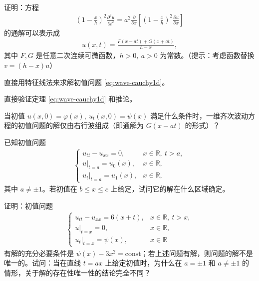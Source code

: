 \documentclass[../../main.tex]{subfiles}%
\begin{document}
\begin{example}
证明：方程
\begin{align*}
\left(1-\frac{x}{h}\right)^2\frac{\partial^2u}{\partial t^2}
=a^2\frac{\partial}{\partial x}\left[\left(1-\frac{x}{h}\right)^2\frac{\partial u}{\partial x}\right]
\end{align*}
的通解可以表示成
\begin{align*}
u(x,t)=\frac{F(x-at)+G(x+at)}{h-x},
\end{align*}
其中 $F,G$ 是任意二次连续可微函数，$h>0,\ a>0$ 为常数。（提示：考虑函数替换 $v=(h-x)u$）
\end{example}

\begin{example}
直接用特征线法来求解初值问题 \eqref{eq:wave-cauchy1d}。
\end{example}

\begin{example}
直接验证定理 \eqref{eq:wave-cauchy1d} 和推论。
\end{example}

\begin{example}
当初值 $u(x,0)=\varphi(x),\ u_t(x,0)=\psi(x)$ 满足什么条件时，一维齐次波动方程的初值问题的解仅由右行波组成（即通解为 $G(x-at)$ 的形式）？
\end{example}

\begin{example}
已知初值问题
\begin{align*}
\begin{cases}
u_{tt}-u_{xx}=0, & x\in\mathbb{R},\ t>a, \\
u|_{t=a}=u_0(x), & x\in\mathbb{R}, \\
u_t|_{t=a}=u_1(x), & x\in\mathbb{R},
\end{cases}
\end{align*}
其中 $a\neq\pm 1$。若初值在 $b\leqslant x\leqslant c$ 上给定，试问它的解在什么区域确定。
\end{example}

\begin{example}
证明：初值问题
\begin{align*}
\begin{cases}
u_{tt}-u_{xx}=6(x+t), & x\in\mathbb{R},\ t>x, \\
u|_{t=x}=0, & x\in\mathbb{R}, \\
u_t|_{t=x}=\psi(x), & x\in\mathbb{R}
\end{cases}
\end{align*}
有解的充分必要条件是 $\psi(x)-3x^2=\text{const}$；若上述问题有解，则问题的解不是唯一的。试问：当在直线 $t=ax$ 上给定初值时，为什么在 $a=\pm 1$ 和 $a\neq\pm 1$ 的情形，关于解的存在性唯一性的结论完全不同？
\end{example}
\end{document}
